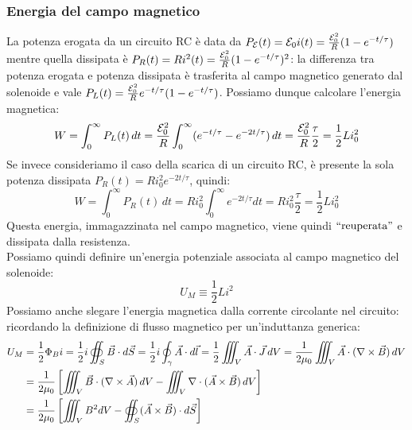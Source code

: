 \subsubsection{Energia del campo magnetico}

La potenza erogata da un circuito RC è data da $ P_{\mathcal{E}}(t) = \mathcal{E}_0 i(t) = \frac{\mathcal{E}_0^2}{R} (1 - e^{-t/\tau}) $ mentre quella dissipata è $ P_R(t) = R i^2(t) = \frac{\mathcal{E}_0^2}{R} (1 - e^{-t/\tau})^2 $: la differenza tra potenza erogata e potenza dissipata è trasferita al campo magnetico generato dal solenoide e vale $ P_L(t) = \frac{\mathcal{E}_0^2}{R} e^{-t/\tau} (1 - e^{-t/\tau}) $. Possiamo dunque calcolare l'energia magnetica:
\begin{equation}
	W = \int_0^{\infty} P_L(t) \, dt = \frac{\mathcal{E}_0^2}{R} \int_0^{\infty} (e^{-t/\tau} - e^{-2t/\tau}) \, dt = \frac{\mathcal{E}_0^2}{R}\frac{\tau}{2} = \frac{1}{2}L i_0^2
	\label{eq:33}
\end{equation}
%
Se invece consideriamo il caso della scarica di un circuito RC, è presente la sola potenza dissipata $ P_R(t) = Ri_0^2 e^{-2t/\tau} $, quindi:
\begin{equation}
	W = \int_0^{\infty} P_R(t) \, dt = Ri_0^2 \int_0^{\infty} e^{-2t/\tau} dt = R i_0^2 \frac{\tau}{2} = \frac{1}{2} L i_0^2
	\label{eq:34}
\end{equation}
Questa energia, immagazzinata nel campo magnetico, viene quindi $ ``\text{reuperata}" $ e dissipata dalla resistenza. \\ 
%
Possiamo quindi definire un'energia potenziale associata al campo magnetico del solenoide:
\begin{equation}
	U_M \equiv \frac{1}{2} Li^2
	\label{eq:35}
\end{equation}
%
Possiamo anche slegare l'energia magnetica dalla corrente circolante nel circuito: ricordando la definizione di flusso magnetico per un'induttanza generica:
\begin{equation}
	\begin{split}
		U_M &= \frac{1}{2} \Phi_B i = \frac{1}{2} i \oiint_S \vec{B} \cdot d\vec{S} = \frac{1}{2} i \oint_{\gamma} \vec{A} \cdot d\vec{l} = \frac{1}{2} \iiint_V \vec{A}\cdot\vec{J} \,dV = \frac{1}{2\mu_0} \iiint_V \vec{A}\cdot (\nabla\times\vec{B}) \,dV \\ 
		    &= \frac{1}{2\mu_0} \left[ \iiint_V \vec{B}\cdot (\nabla\times\vec{A}) \,dV - \iiint_V \nabla\cdot (\vec{A}\times\vec{B}) \,dV \right] \\ 
		    &= \frac{1}{2\mu_0} \left[ \iiint_V B^2 dV - \oiint_S (\vec{A}\times\vec{B}) \cdot d\vec{S} \right]
	\end{split}
	\label{eq:36}
\end{equation}
